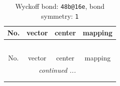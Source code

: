 \documentclass[fleqn,8pt]{jsarticle}
\begin{document}
\renewcommand{\arraystretch}{1.2}
\begin{longtable}{cccc}
\caption{Wyckoff bond: {\tt 48b@16e}, bond symmetry: {\tt 1}}
 \\
 \hline \hline
No. & vector & center & mapping \\ \hline \endfirsthead

\multicolumn{3}{l}{\tablename\ \thetable{}} \\
 \hline \hline
No. & vector & center & mapping \\ \hline \endhead

 \hline \hline
\multicolumn{3}{r}{\footnotesize\it continued ...} \\ \endfoot

 \hline \hline
\multicolumn{3}{r}{} \\ \endlastfoot


\end{longtable}
\end{document}
